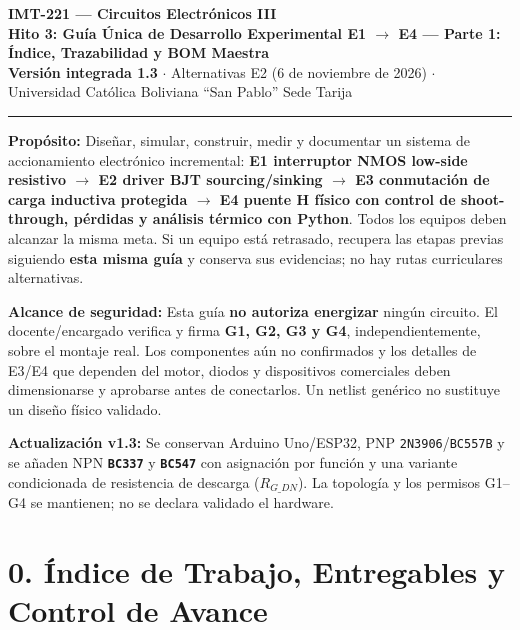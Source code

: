 \documentclass[10pt, a4paper, landscape]{article}
\begin{document}
\noindent
{\LARGE \textbf{\textcolor{ucbblue}{IMT-221 — Circuitos Electrónicos III}}}\\[0.12cm]
{\Large \textbf{Hito 3: Guía Única de Desarrollo Experimental E1 $\rightarrow$ E4 — Parte 1: Índice, Trazabilidad y BOM Maestra}}\\[0.08cm]
{\small \textbf{Versión integrada 1.3} $\cdot$ Alternativas E2 (6 de noviembre de 2026) $\cdot$ Universidad Católica Boliviana ``San Pablo'' Sede Tarija}
\par\vspace{0.15cm}\noindent\rule{\linewidth}{0.4pt}\vspace{0.2cm}

\noindent
\textbf{Propósito:} Diseñar, simular, construir, medir y documentar un sistema de accionamiento electrónico incremental: \textbf{E1 interruptor NMOS low-side resistivo $\rightarrow$ E2 driver BJT sourcing/sinking $\rightarrow$ E3 conmutación de carga inductiva protegida $\rightarrow$ E4 puente H físico con control de shoot-through, pérdidas y análisis térmico con Python}. Todos los equipos deben alcanzar la misma meta. Si un equipo está retrasado, recupera las etapas previas siguiendo \textbf{esta misma guía} y conserva sus evidencias; no hay rutas curriculares alternativas.

\vspace{0.12cm}
\noindent
\textbf{\textcolor{warnred}{Alcance de seguridad:}} Esta guía \textbf{no autoriza energizar} ningún circuito. El docente/encargado verifica y firma \textbf{G1, G2, G3 y G4}, independientemente, sobre el montaje real. Los componentes aún no confirmados y los detalles de E3/E4 que dependen del motor, diodos y dispositivos comerciales deben dimensionarse y aprobarse antes de conectarlos. Un netlist genérico no sustituye un diseño físico validado.

\vspace{0.12cm}
\noindent
\textbf{Actualización v1.3:} Se conservan Arduino Uno/ESP32, PNP \texttt{2N3906}/\texttt{BC557B} y se añaden NPN \textbf{\texttt{BC337}} y \textbf{\texttt{BC547}} con asignación por función y una variante condicionada de resistencia de descarga ($R_{G\_DN}$). La topología y los permisos G1--G4 se mantienen; no se declara validado el hardware.

\section*{0. Índice de Trabajo, Entregables y Control de Avance}
\end{document}
